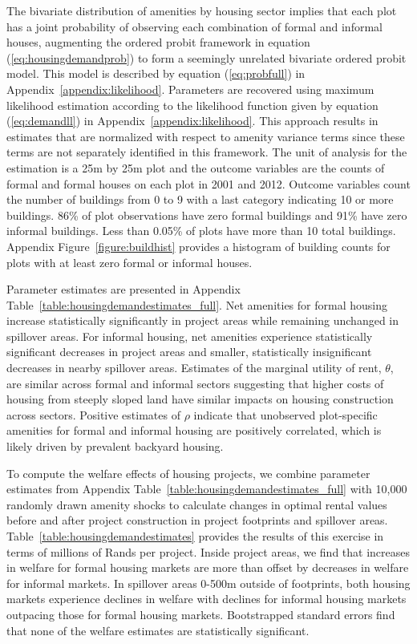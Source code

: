 \documentclass[12pt]{article}
\begin{document}
The bivariate distribution of amenities by housing sector implies that each plot has a joint probability of observing each combination of formal and informal houses, augmenting the ordered probit framework in equation (\ref{eq:housingdemandprob}) to form a seemingly unrelated bivariate ordered probit model.  This model is described by equation (\ref{eq:probfull}) in Appendix~\ref{appendix:likelihood}.  Parameters are recovered using maximum likelihood estimation according to the likelihood function given by equation (\ref{eq:demandll}) in Appendix~\ref{appendix:likelihood}.  This approach results in estimates that are normalized with respect to amenity variance terms since these terms are not separately identified in this framework.  The unit of analysis for the estimation is a 25m by 25m plot and the outcome variables are the counts of formal and formal houses on each plot in 2001 and 2012.  Outcome variables count the number of buildings from 0 to 9 with a last category indicating 10 or more buildings.  86\% of plot observations have zero formal buildings and 91\% have zero informal buildings.  Less than 0.05\% of plots have more than 10 total buildings.  Appendix Figure~\ref{figure:buildhist} provides a histogram of building counts for plots with at least zero formal or informal houses.  

Parameter estimates are presented in Appendix Table~\ref{table:housingdemandestimates_full}.  Net amenities for formal housing increase statistically significantly in project areas while remaining unchanged in spillover areas.  For informal housing, net amenities experience statistically significant decreases in project areas and smaller, statistically insignificant decreases in nearby spillover areas.  Estimates of the marginal utility of rent, $\theta$, are similar across formal and informal sectors suggesting that higher costs of housing from steeply sloped land have similar impacts on housing construction across sectors.  Positive estimates of $\rho$ indicate that unobserved plot-specific amenities for formal and informal housing are positively correlated, which is likely driven by prevalent backyard housing.  

To compute the welfare effects of housing projects, we combine parameter estimates from Appendix Table~\ref{table:housingdemandestimates_full} with 10,000 randomly drawn amenity shocks to calculate changes in optimal rental values before and after project construction in project footprints and spillover areas.  Table~\ref{table:housingdemandestimates} provides the results of this exercise in terms of millions of Rands per project.  Inside project areas, we find that increases in welfare for formal housing markets are more than offset by decreases in welfare for informal markets.  In spillover areas 0-500m outside of footprints, both housing markets experience declines in welfare with declines for informal housing markets outpacing those for formal housing markets.  Bootstrapped standard errors find that none of the welfare estimates are statistically significant.  
\end{document}
